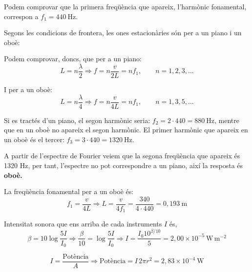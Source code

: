 \begin{solapartat}
 Podem comprovar que la primera freqüència que apareix, l'harmònic fonamental, correspon a $f_1 = 440\ \mathrm{Hz}$.

 Segons les condicions de frontera, les ones estacionàries són per a un piano i un oboè:


Podem comprovar, doncs, que per a un piano:
\[ L = n\frac{\lambda}{2} \Rightarrow f = n\frac{v}{2L} = nf_1, \qquad n = 1, 2, 3, \ldots \]

I per a un oboè:
\[ L = n\frac{\lambda}{4} \Rightarrow f = n\frac{v}{4L} = nf_1, \qquad n = 1, 3, 5, \ldots \]

Si es tractés d'un piano, el segon harmònic seria: $f_2 = 2\cdot 440 = 880\ \mathrm{Hz}$, mentre que en un oboè no apareix el segon harmònic. El primer harmònic que apareix en un oboè és el tercer: $f_3 = 3\cdot 440 = 1320\ \mathrm{Hz}$.

A partir de l'espectre de Fourier veiem que la segona freqüència que apareix és 1320 Hz, per tant, l'espectre no pot correspondre a un piano, així la resposta és \textbf{oboè.}

 La freqüència fonamental per a un oboè és:
\[ f_1 = \frac{v}{4L} \Rightarrow L = \frac{v}{4f_1} = \frac{340}{4\cdot 440} = 0,193\ \mathrm{m} \]
\end{solapartat}

\begin{solapartat}
 Intensitat sonora que ens arriba de cada instruments $I$ és,
\[ \beta = 10\log\frac{5I}{I_0} \Rightarrow \frac{\beta}{10} = \log\frac{5I}{I_0} \Rightarrow I = \frac{I_0 10^{\beta/10}}{5} = 2,00\times 10^{-5}\ \mathrm{W\,m^{-2}} \]

\[ I = \frac{\text{Potència}}{A} \Rightarrow \text{Potència} = I\,2\pi r^2 = 2,83\times 10^{-4}\ \mathrm{W} \]
\end{solapartat}
